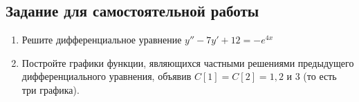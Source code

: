 \subsection*{\textbf{Задание для самостоятельной работы}}

\begin{enumerate}
    \item Решите дифференциальное уравнение $y'' - 7y' + 12 = -e^{4x}$
    \begin{figure}[H]
        \renewcommand{\figurename}{Рисунок}
        \label{fig:image_self_2_1}
    \end{figure}
    \item Постройте графики функции, являющихся частными решениями предыдущего дифференциального уравнения, объявив
    $C[1] = C[2] = 1,2$ и $3$ (то есть три графика).
    \begin{figure}[H]
        \renewcommand{\figurename}{Рисунок}
        \label{fig:image_self_2_2}

\end{figure}
\end{enumerate}
